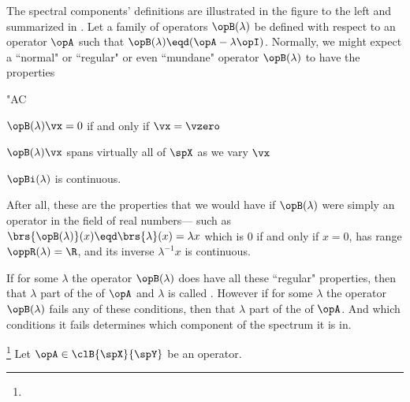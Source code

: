 \hfill
\begin{minipage}[c]{6\tw/16-1ex}
The spectral components' definitions are illustrated in the figure to the left and 
summarized in .
Let a family of operators $\opB(\lambda)$ be defined with respect to an operator $\opA$
such that $\opB(\lambda)\eqd(\opA-\lambda\opI)$.
Normally, we might expect a ``normal" or ``regular" or even ``mundane" operator 
$\opB(\lambda)$ to have the properties
  \begin{dingautolist}{"AC}
    \item $\opB(\lambda)\vx=0$ if and only if $\vx=\vzero$
    \item $\opB(\lambda)\vx$ spans virtually all of $\spX$ as we vary $\vx$
    \item $\opBi(\lambda)$ is continuous.
  \end{dingautolist}
\end{minipage}
After all, these are the properties that we would have if $\opB(\lambda)$ 
were simply an  operator in the field of real numbers---
such as $\brs{\opB(\lambda)}(x)\eqd \brs{\lambda}(x)=\lambda x$
which is $0$ if and only if $x=0$, has range $\oppR(\lambda)=\R$,
and its inverse $\lambda^{-1}x$ is continuous.

If for some $\lambda$ the operator $\opB(\lambda)$ 
does have all these ``regular" properties, 
then that $\lambda$ part of the  of $\opA$ and $\lambda$ is called
.
However if for some $\lambda$ the operator $\opB(\lambda)$ 
fails any of these conditions, then that $\lambda$ part of the  of $\opA$.
And which conditions it fails determines which component of the spectrum it is in.

\begin{theorem}
\footnote{
  }
Let $\opA\in\clB{\spX}{\spY}$ be an operator.
\thmbox{
  \oppSpec(\opA) = \oppSpecp(\opA) \setu \oppSpecc(\opA) \setu \oppSpecr(\opA)
  }
\end{theorem}

